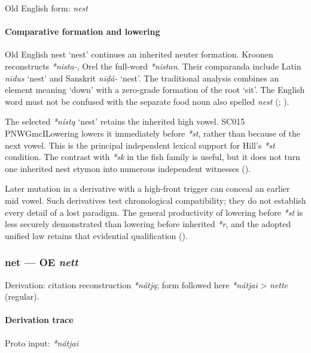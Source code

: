 \documentclass[
  british,
  a4paper,
]{article}
\providecommand{\Recon}[1]{\emph{*#1}}
\begin{document}
Old English form: \emph{nest}

\paragraph{Comparative formation and
lowering}\label{comparative-formation-and-lowering}

Old English {nest} `nest' continues an inherited neuter formation.
Kroonen reconstructs \emph{*nista-}, Orel the full-word \emph{*nistan}.
Their comparanda include Latin \emph{nīdus} `nest' and Sanskrit
\emph{nīḍá-} `nest'. The traditional analysis combines an element
meaning `down' with a zero-grade formation of the root `sit'. The
English word must not be confused with the separate food noun also
spelled \emph{nest} (;
).

The selected \Recon{nístą} `nest' retains the inherited high vowel.
SC015 PNWGmcILowering lowers it immediately before \emph{*st}, rather
than because of the next vowel. This is the principal independent
lexical support for Hill's \emph{*st} condition. The contrast with
\emph{*sk} in the fish family is useful, but it does not turn one
inherited nest etymon into numerous independent witnesses
().

Later mutation in a derivative with a high-front trigger can conceal an
earlier mid vowel. Such derivatives test chronological compatibility;
they do not establish every detail of a lost paradigm. The general
productivity of lowering before \emph{*st} is less securely demonstrated
than lowering before inherited \emph{*r}, and the adopted unified law
retains that evidential qualification ().

\subsubsection{\texorpdfstring{net --- OE
\emph{nett}}{net --- OE nett}}\label{net-oe-nett}

Derivation: citation reconstruction \emph{*nátją}; form followed here
\emph{*nátjai} \textgreater{} \emph{nette} (regular).

\paragraph{Derivation trace}\label{derivation-trace-63}

Proto input: \emph{*nátjai}
\end{document}
